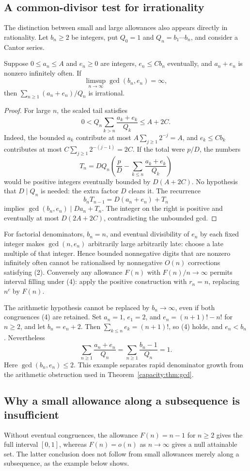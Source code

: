 \documentclass[11pt]{article}
\begin{document}
\subsection{A common-divisor test for irrationality}\label{capacity:sec:carry}
The distinction between small and large allowances also appears directly in
rationality. Let $b_n\ge2$ be integers, put $Q_0=1$ and
$Q_n=b_1\cdots b_n$, and consider a Cantor series.
\begin{theorem}\label{capacity:thm:gcd}
Suppose $0\le a_n\le A$ and $e_n\ge0$ are integers, $e_n\le Cb_n$
eventually, and $a_n+e_n$ is nonzero infinitely often. If
\[
 \limsup_{n\to\infty}\gcd(b_n,e_n)=\infty,
\]
then $\sum_{n\ge1}(a_n+e_n)/Q_n$ is irrational.
\end{theorem}
\begin{proof}
For large $n$, the scaled tail satisfies
\[
 0<Q_n\sum_{k>n}\frac{a_k+e_k}{Q_k}\le A+2C.
\]
Indeed, the bounded $a_k$ contribute at most
$A\sum_{j\ge1}2^{-j}=A$, and $e_k\le Cb_k$ contributes at most
$C\sum_{j\ge1}2^{-(j-1)}=2C$.
If the total were $p/D$, the numbers
\[
 T_n=DQ_n\left(\frac pD-\sum_{k\le n}\frac{a_k+e_k}{Q_k}\right)
\]
would be positive integers eventually bounded by $D(A+2C)$. No hypothesis
that $D\mid Q_n$ is needed: the extra factor $D$ clears it. The recurrence
\[
 b_nT_{n-1}=D(a_n+e_n)+T_n
\]
implies $\gcd(b_n,e_n)\mid Da_n+T_n$. The integer on the right is positive
and eventually at most $D(2A+2C)$, contradicting the unbounded gcd.
\end{proof}
For factorial denominators, $b_n=n$, and eventual divisibility of $e_n$ by
each fixed integer makes $\gcd(n,e_n)$ arbitrarily large arbitrarily late:
choose a late multiple of that integer. Hence bounded nonnegative digits that
are nonzero infinitely often cannot be rationalised by nonnegative $O(n)$
corrections satisfying (2). Conversely any allowance $F(n)$ with
$F(n)/n\to\infty$ permits interval filling under (4): apply the positive
construction with $r_n=n$, replacing $n^c$ by $F(n)$.

The arithmetic hypothesis cannot be replaced by $b_n\to\infty$, even if both
congruences (4) are retained. Set $a_n=1$, $e_1=2$, and
$e_n=(n+1)!-n!$ for $n\ge2$, and let $b_n=e_n+2$.
Then $\sum_{k\le n}e_k=(n+1)!$, so (4) holds, and $e_n<b_n$. Nevertheless
\[
 \sum_{n\ge1}\frac{a_n+e_n}{Q_n}
 =\sum_{n\ge1}\frac{b_n-1}{Q_n}=1.
\]
Here $\gcd(b_n,e_n)\le2$. This example separates rapid denominator growth
from the arithmetic obstruction used in Theorem~\ref{capacity:thm:gcd}.


\subsection{Why a small allowance along a subsequence is insufficient}
Without eventual congruences, the allowance $F(n)=n-1$ for $n\ge2$ gives the
  full interval $[0,1]$, whereas $F(n)=o(n)$ as $n\to\infty$ gives a null
  attainable set.  The latter conclusion does not follow from small
  allowances merely along a subsequence, as the example below shows.
\end{document}
